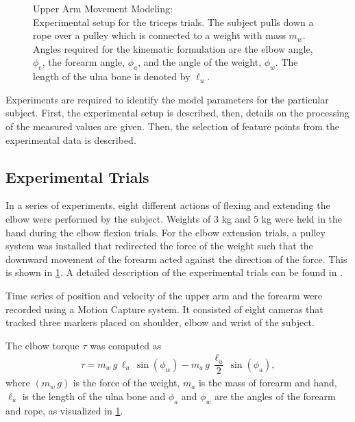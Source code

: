 \begin{figure}%
    \centering%
    \def\svgwidth{5cm}%
    \caption{Upper Arm Movement Modeling: \\Experimental setup for the triceps trials. The subject pulls down a rope over a pulley which is connected to a weight with mass $m_w$.
    Angles required for the kinematic formulation are the elbow angle, $\phi_e$, the forearm angle, $\phi_a$, and the angle of the weight, $\phi_w$. The length of the ulna bone is denoted by $\ell_u$.}%
    \label{fig:summer_school_study}%
\end{figure}%

Experiments are required to identify the model parameters for the particular subject. First, the experimental setup is described, then, details on the processing of the measured values are given. Then, the selection of feature points from the experimental data is described.

\subsection{Experimental Trials}

In a series of experiments, eight different actions of flexing and extending the elbow were performed by the subject. Weights of 3 kg and 5 kg were held in the hand during the elbow flexion trials. For the elbow extension trials, a pulley system was installed that redirected the force of the weight such that the downward movement of the forearm acted against the direction of the force. This is shown in \cref{fig:summer_school_study}. A detailed description of the experimental trials can be found in \cite{summerschool2019}.

Time series of position and velocity of the upper arm and the forearm were recorded using a Motion Capture system. It consisted of eight cameras that tracked three markers placed on shoulder, elbow and wrist of the subject. 

The elbow torque $\tau$ was computed as
\begin{equation*}
  \begin{array}{lll}
    \tau = m_w\,g\,\ell_u\,\sin(\phi_w) - m_{a}\,g\,\dfrac{\ell_u}{2}\,\sin(\phi_a),
  \end{array}
\end{equation*}
where $(m_w\,g)$ is the force of the weight, $m_{a}$ is the mass of forearm and hand, $\ell_u$ is the length of the ulna bone and $\phi_a$ and $\phi_w$ are the angles of the forearm and rope, as visualized in \cref{fig:summer_school_study}.

